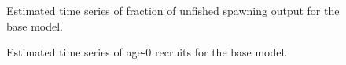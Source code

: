 \documentclass[
]{scrartcl}
\begin{document}
\begin{figure}[H]


\caption{\label{fig-depl}Estimated time series of fraction of unfished
spawning output for the base model.}

\end{figure}%

\begin{figure}[H]


\caption{\label{fig-recruits}Estimated time series of age-0 recruits for
the base model.}

\end{figure}%
\end{document}
